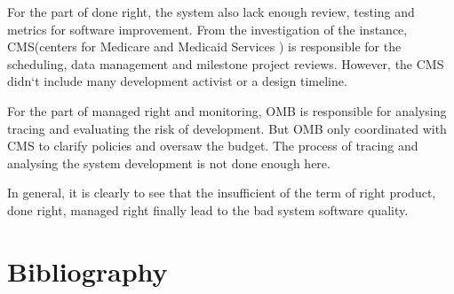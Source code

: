 \documentclass[11pt,twoside,a4paper]{article}
\begin{document}
For the part of done right, the system also lack enough review, testing and metrics for software improvement. From the investigation of the instance, CMS(centers for Medicare and Medicaid Services ) is responsible for the scheduling, data management and milestone project reviews. However, the CMS didn`t include many development activist or a design timeline. 

For the part of managed right and monitoring, OMB is responsible for analysing tracing and evaluating the risk of development. But OMB only coordinated with CMS to clarify policies and oversaw the budget. The process of tracing and analysing the system development is not done enough here. 

In general, it is clearly to see that the insufficient of the term of right product, done right, managed right finally lead to the bad system software quality. 



\section{Bibliography}



\end{document}
